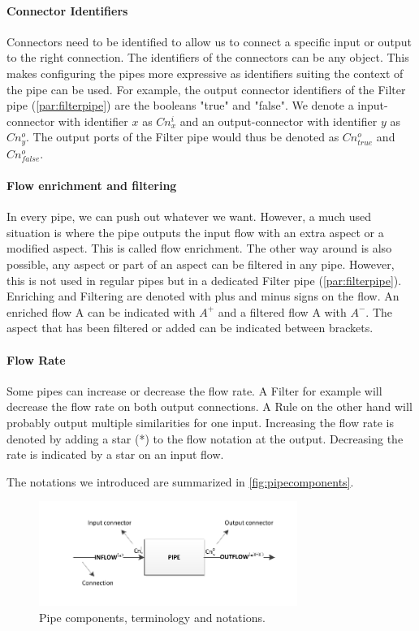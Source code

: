 \paragraph{Connector Identifiers} Connectors need to be identified to allow us to connect a specific input or output to the right connection. The identifiers of the connectors can be any object. This makes configuring the pipes more expressive as identifiers suiting the context of the pipe can be used. For example, the output connector identifiers of the Filter pipe (\autoref{par:filterpipe}) are the booleans "true" and "false". We denote a input-connector with identifier $x$ as $Cn^i_x$ and an output-connector with identifier $y$ as $Cn^o_y$. The output ports of the Filter pipe would thus be denoted as $Cn^o_{true}$ and $Cn^o_{false}$.

\paragraph{Flow enrichment and filtering} In every pipe, we can push out whatever we want. However, a much used situation is where the pipe outputs the input flow with an extra aspect or a modified aspect. This is called flow enrichment. The other way around is also possible, any aspect or part of an aspect can be filtered in any pipe. However, this is not used in regular pipes but in a dedicated Filter pipe (\autoref{par:filterpipe}). Enriching and Filtering are denoted with plus and minus signs on the flow. An enriched flow A can be indicated with $A^+$ and a filtered flow A with $A^-$. The aspect that has been filtered or added can be indicated between brackets.

\paragraph{Flow Rate} Some pipes can increase or decrease the flow rate. A Filter for example will decrease the flow rate on both output connections. A Rule on the other hand will probably output multiple similarities for one input. Increasing the flow rate is denoted by adding a star (*) to the flow notation at the output. Decreasing the rate is indicated by a star on an input flow.

The notations we introduced are summarized in \autoref{fig:pipecomponents}.

\begin{figure}[htb]
	\centering
		\includegraphics[width=0.75\textwidth]{fig/pipecomponents}
	\caption{Pipe components, terminology and notations.}
	\label{fig:pipecomponents}
\end{figure}


